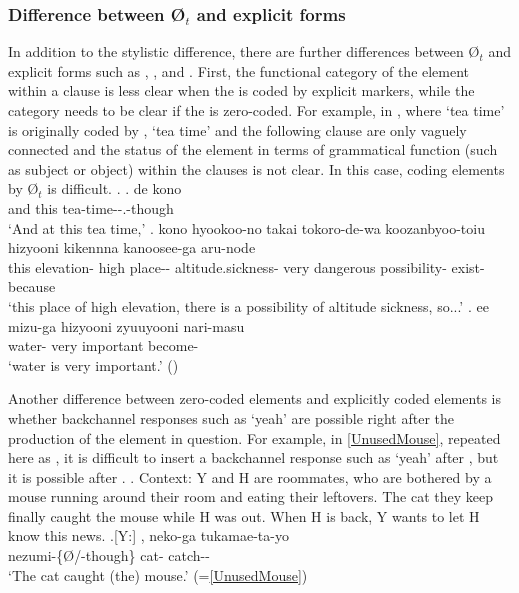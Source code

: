 \subsubsection{Difference between {\O$_{t}$} and explicit forms}

In addition to the stylistic difference,
there are further differences between {\O$_{t}$} and explicit forms such as , , and .
First,
the functional category of the  element within a clause is less clear when the  is coded by explicit markers,
while the category needs to be clear
if the  is zero-coded.
For example, in \Next,
where  `tea time' is originally coded by ,
`tea time' and the following clause are only vaguely connected
and the status of the  element in terms of grammatical function (such as subject or object) within the clauses is not clear.
In this case, coding elements by {\O$_{t}$} is difficult.
%
\ex. \ag. de kono  \\
		and this tea-time--.-though \\
		`And at this tea time,'
	\bg. kono hyookoo-no {takai} {tokoro-de-wa} koozanbyoo-toiu hizyooni {kikennna} {kanoosee-ga} aru-node \\
		this elevation- high place-- altitude.sickness- very dangerous possibility- exist-because \\
		`this place of high elevation, there is a possibility of altitude sickness, so...'
	\bg. ee {mizu-ga} hizyooni zyuuyooni nari-masu \\
		 water- very important become- \\
		`water is very important.'
		 \hfill{()}



Another difference between zero-coded elements and explicitly coded elements is whether backchannel responses such as  `yeah' are possible right after the production of the  element in question.
For example, in \ref{UnusedMouse}, repeated here as \Next,
it is difficult to insert a backchannel response such as  `yeah' after ,
but it is possible after .
%
\ex. Context: Y and H are roommates,
	who are bothered by a mouse running around their room
	and eating their leftovers.
	The cat they keep finally caught the mouse while H was out.
	When H is back, Y wants to let H know this news.
	\ag.[Y:] , neko-ga tukamae-ta-yo \\
		nezumi-\{{\O}/-though\} cat- catch-- \\
		`The cat caught (the) mouse.' \hfill{(=\ref{UnusedMouse})}

